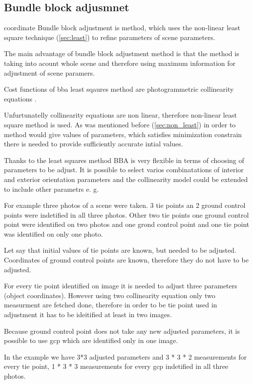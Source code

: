 \documentclass[a4paper,12pt]{report}
\begin{document}
\begin{itemize}
\section{Bundle block adjusmnet}
coordinate
Bundle block adjustment is method, which uses the non-linear least square technique (\ref{sec:least}) to refine parameters 
of scene parameters. 

The main advantage of bundle block adjustment method is that the method is taking into acount whole scene and therefore using 
maximum information for adjustment of scene paramers.

Cost functions of bba least sqaures method are photogrammetric collinearity equations \label{eq:p_abbr}.

Unfurtunatelly collinearity equations are non linear, therefore non-linear least square method is used. 
As was mentioned before  (\ref{sec:non_least}) in order to method would give values of parameters, which 
satisfies minimization constrain there is needed to provide sufficiently accurate intial values.

Thanks to the least squares method BBA is very flexible in terms of choosing of parameters to be adjust. 
It is possible to select varios combinatations of interior and exterior orientation parameters and 
the collinearity model could be extended to include other parametrs e. g.  




For example three photos of a scene were taken. 3 tie points an 2 ground control points were indetified in all three photos.
Other two tie points one ground control point were identified on two photos and one grond control point and one tie point was identified 
on only one photo. 

Let say that initial values of tie points are known, but needed to be adjusted.
Coordinates of ground control points are known, therefore they do not have to be adjusted. 

For every tie point identified on image it is needed to adjust three parameters (object coordinates).
However using two collinearity equation only two measurment are fetched done, 
therefore in order to be tie point used in adjustment it has to be ideitified at least in two images. 

Because ground control point does not take any new adjusted parameters, it is possible to use gcp which are identified only in one image. 

In the example we have 3*3 adjusted parameters and 3 * 3 * 2 measurements for every tie point,  
1 * 3 * 3 measurements for every gcp indetified in all three photos. 


\end{itemize}
\end{document}
